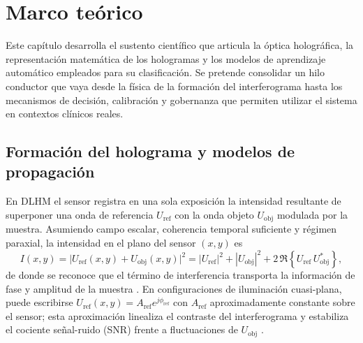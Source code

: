 \chapter{Marco teórico}\label{chap:marco}
Este capítulo desarrolla el sustento científico que articula la óptica holográfica, la representación matemática de los hologramas y los modelos de aprendizaje automático empleados para su clasificación. Se pretende consolidar un hilo conductor que vaya desde la física de la formación del interferograma hasta los mecanismos de decisión, calibración y gobernanza que permiten utilizar el sistema en contextos clínicos reales.

\section{Formación del holograma y modelos de propagación}

En DLHM el sensor registra en una sola exposición la intensidad resultante de superponer una onda de referencia \(U_{\text{ref}}\) con la onda objeto \(U_{\text{obj}}\) modulada por la muestra. Asumiendo campo escalar, coherencia temporal suficiente y régimen paraxial, la intensidad en el plano del sensor \((x,y)\) es
\begin{equation}
I(x,y)=\bigl|U_{\text{ref}}(x,y)+U_{\text{obj}}(x,y)\bigr|^{2}
=|U_{\text{ref}}|^{2}+|U_{\text{obj}}|^{2}+2\,\Re\!\left\{U_{\text{ref}}\,U_{\text{obj}}^{*}\right\},
\label{eq:intensity}
\end{equation}
de donde se reconoce que el término de interferencia transporta la información de fase y amplitud de la muestra \cite{Amann2019}. En configuraciones de iluminación cuasi-plana, puede escribirse \(U_{\text{ref}}(x,y)=A_{\text{ref}}e^{j\phi_{\text{ref}}}\) con \(A_{\text{ref}}\) aproximadamente constante sobre el sensor; esta aproximación linealiza el contraste del interferograma y estabiliza el cociente señal-ruido (SNR) frente a fluctuaciones de \(U_{\text{obj}}\) \cite{Amann2019,OConnor2020}.

